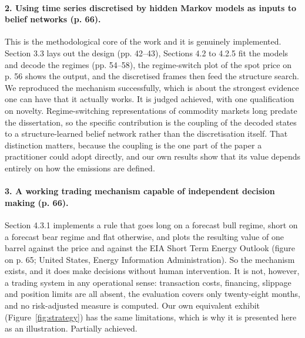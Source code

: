 \documentclass[11pt,a4paper]{article}
\begin{document}
\paragraph{2. Using time series discretised by hidden Markov models as inputs to belief networks
(p. 66).} This is the methodological core of the work and it is genuinely implemented. Section 3.3
lays out the design (pp. 42--43), Sections 4.2 to 4.2.5 fit the models and decode the regimes
(pp. 54--58), the regime-switch plot of the spot price on p. 56 shows the output, and the
discretised frames then feed the structure search. We reproduced the mechanism successfully,
which is about the strongest evidence one can have that it actually works. It is judged achieved,
with one qualification on novelty. Regime-switching representations of commodity markets long
predate the dissertation, so the specific contribution is the coupling of the decoded states to a
structure-learned belief network rather than the discretisation itself. That distinction matters,
because the coupling is the one part of the paper a practitioner could adopt directly, and our
own results show that its value depends entirely on how the emissions are defined.

\paragraph{3. A working trading mechanism capable of independent decision making (p. 66).}
Section 4.3.1 implements a rule that goes long on a forecast bull regime, short on a forecast bear
regime and flat otherwise, and plots the resulting value of one barrel against the price and
against the EIA Short Term Energy Outlook (figure on p. 65; United States, Energy Information
Administration). So the mechanism exists, and it does make decisions without human intervention.
It is not, however, a trading system in any operational sense: transaction costs, financing,
slippage and position limits are all absent, the evaluation covers only twenty-eight months, and
no risk-adjusted measure is computed. Our own equivalent exhibit (Figure~\ref{fig:strategy}) has
the same limitations, which is why it is presented here as an illustration. Partially achieved.
\end{document}
